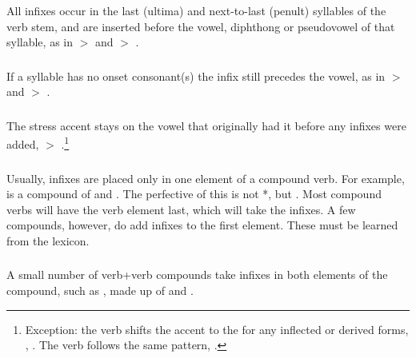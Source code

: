 \subsubsection{} All infixes occur in the last (ultima) and
next-to-last (penult) syllables of the verb stem, and are inserted
before the vowel, diphthong or pseudovowel of that syllable, as in
 $>$  and  $>$ .

\subsubsection{} If a syllable has no onset consonant(s) the infix
still precedes the vowel, as in  $>$  and 
$>$ .

\subsubsection{} The stress accent stays on the vowel that originally
had it before any infixes were added,  $>$
.\footnote{Exception: the verb 
shifts the accent to the  for any inflected or derived forms,
, . 
The verb  follows the same pattern, .
}

\subsubsection{} Usually, infixes are placed only in one element of a
compound verb.  For example,   is a compound of
  and  .  The perfective of this is not
*, but .  Most compound verbs
will have the verb element last, which will take the infixes.  A few
compounds, however, do add infixes to the first element.  These must
be learned from the lexicon.  

\subsubsection{} A small number of verb+verb compounds take infixes in
both elements of the compound, such as  ,
made up of   and  .

